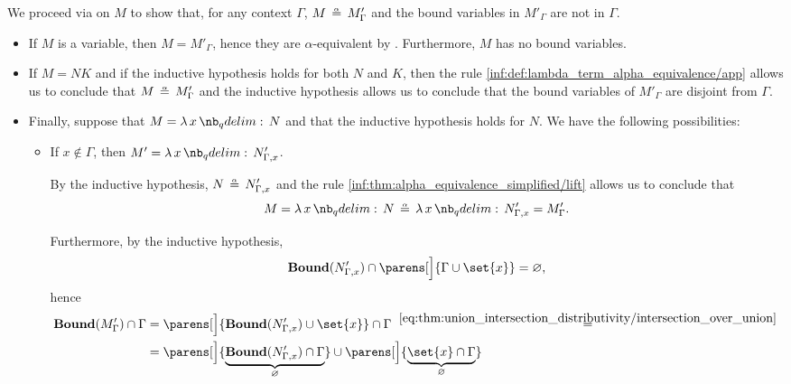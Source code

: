 \begin{defproof}
  We proceed via  on \( M \) to show that, for any context \( \Gamma \), \( M \aequiv M'_\Gamma \) and the bound variables in \( M'_\Gamma \) are not in \( \Gamma \).

  \begin{itemize}
    \item If \( M \) is a variable, then \( M = M'_\Gamma \), hence they are \( \alpha \)-equivalent by . Furthermore, \( M \) has no bound variables.

    \item If \( M = NK \) and if the inductive hypothesis holds for both \( N \) and \( K \), then the rule \ref{inf:def:lambda_term_alpha_equivalence/app} allows us to conclude that \( M \aequiv M'_\Gamma \) and the inductive hypothesis allows us to conclude that the bound variables of \( M'_\Gamma \) are disjoint from \( \Gamma \).

    \item Finally, suppose that \( M = \qabs x N \) and that the inductive hypothesis holds for \( N \). We have the following possibilities:
    \begin{itemize}
      \item If \( x \not\in \Gamma \), then \( M' = \qabs x N'_{\Gamma,x} \).

      By the inductive hypothesis, \( N \aequiv N'_{\Gamma,x} \) and the rule \ref{inf:thm:alpha_equivalence_simplified/lift} allows us to conclude that
      \begin{equation*}
        M = \qabs x N \aequiv \qabs x N'_{\Gamma,x} = M'_\Gamma.
      \end{equation*}

      Furthermore, by the inductive hypothesis,
      \begin{equation*}
        \op*{Bound}(N'_{\Gamma,x}) \cap \parens[\Big]{ \Gamma \cup \set{ x } } = \varnothing,
      \end{equation*}
      hence
      \begin{align*}
        \op*{Bound}(M'_\Gamma) \cap \Gamma
        &=
        \parens[\Big]{ \op*{Bound}(N'_{\Gamma,x}) \cup \set{ x } } \cap \Gamma
        \reloset {\eqref{eq:thm:union_intersection_distributivity/intersection_over_union}} = \\ &=
        \parens[\Big]{ \underbrace{\op*{Bound}(N'_{\Gamma,x}) \cap \Gamma }_\varnothing } \cup \parens[\Big]{ \underbrace{\set{ x } \cap \Gamma}_\varnothing }
      \end{align*}


\end{itemize}
\end{itemize}
\end{defproof}
